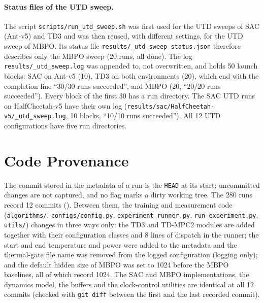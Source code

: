 \paragraph{Status files of the UTD sweep.} The script \texttt{scripts/run\_utd\_sweep.sh} was first used for the UTD sweeps of SAC (Ant-v5) and TD3 and was then reused, with different settings, for the UTD sweep of MBPO.
Its status file \texttt{results/\_utd\_sweep\_status.json} therefore describes only the MBPO sweep (\num{20} runs, all done).
The log \texttt{results/\_utd\_sweep.log} was appended to, not overwritten, and holds \num{50} launch blocks: SAC on Ant-v5 (\num{10}), TD3 on both environments (\num{20}), which end with the completion line ``\num{30}/\num{30} runs succeeded'', and MBPO (\num{20}, ``\num{20}/\num{20} runs succeeded'').
Every block of the first \num{30} has a run directory.
The SAC UTD runs on HalfCheetah-v5 have their own log (\texttt{results/sac/HalfCheetah-v5/\_utd\_sweep.log}, \num{10} blocks, ``\num{10}/\num{10} runs succeeded'').
All \num{12} UTD configurations have five run directories.

\section{Code Provenance}\label{sec:app-repro-code}

The commit stored in the metadata of a run is the \texttt{HEAD} at its start; uncommitted changes are not captured, and no flag marks a dirty working tree.
The \num{280} runs record \num{12} commits ().
Between them, the training and measurement code (\texttt{algorithms/}, \texttt{configs/config.py}, \texttt{experiment\_runner.py}, \texttt{run\_experiment.py}, \texttt{utils/}) changes in three ways only: the TD3 and TD-MPC2 modules are added together with their configuration classes and \num{8} lines of dispatch in the runner; the start and end temperature and power were added to the metadata and the thermal-gate file name was removed from the logged configuration (logging only); and the default hidden size of MBPO was set to \num{1024} before the MBPO baselines, all of which record \num{1024}.
The SAC and MBPO implementations, the dynamics model, the buffers and the clock-control utilities are identical at all \num{12} commits (checked with \texttt{git diff} between the first and the last recorded commit).

